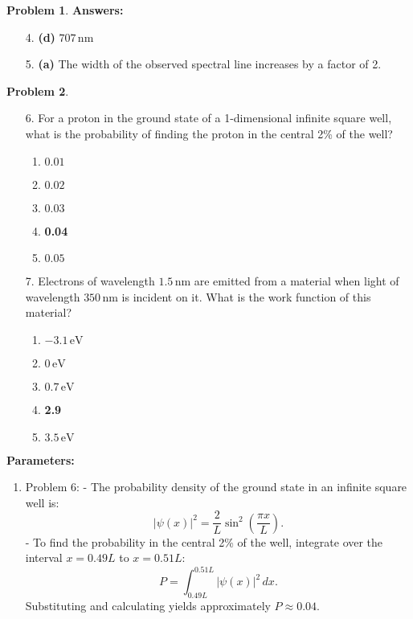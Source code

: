\documentclass[12pt]{article}
\theoremstyle{definition} %
\newtheorem{problem}{Problem}
\theoremstyle{plain} %
\begin{document}
\begin{problem}
\textbf{Answers:}
\begin{enumerate}
    \item[4.] \textbf{(d)} \(707 \, \text{nm}\)
    \item[5.] \textbf{(a)} The width of the observed spectral line increases by a factor of 2.
\end{enumerate}

\end{problem}
\begin{problem}

\begin{enumerate}
    \item[6.] For a proton in the ground state of a 1-dimensional infinite square well, what is the probability of finding the proton in the central 2\% of the well?
    \begin{enumerate}
        \item \(0.01\)
        \item \(0.02\)
        \item \(0.03\)
        \item \textbf{0.04}
        \item \(0.05\)
    \end{enumerate}

    \item[7.] Electrons of wavelength \(1.5 \, \text{nm}\) are emitted from a material when light of wavelength \(350 \, \text{nm}\) is incident on it. What is the work function of this material?
    \begin{enumerate}
        \item \(-3.1 \, \text{eV}\)
        \item \(0 \, \text{eV}\)
        \item \(0.7 \, \text{eV}\)
        \item \textbf{2.9 \, }
        \item \(3.5 \, \text{eV}\)
    \end{enumerate}
\end{enumerate}

\textbf{Parameters:}
\begin{enumerate}
    \item Problem 6:
    - The probability density of the ground state in an infinite square well is:
    $$
    |\psi(x)|^2 = \frac{2}{L} \sin^2\left(\frac{\pi x}{L}\right).
    $$
    - To find the probability in the central 2\% of the well, integrate over the interval \(x = 0.49L\) to \(x = 0.51L\):
    $$
    P = \int_{0.49L}^{0.51L} |\psi(x)|^2 \, dx.
    $$
    Substituting and calculating yields approximately \(P \approx 0.04\).


\end{enumerate}
\end{problem}
\end{document}

